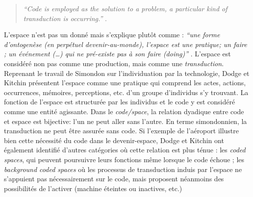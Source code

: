 \begin{quote}
    \textit{``Code is employed as the solution to a problem, a particular kind of transduction  is occurring.''} \citep{Kitchin2011}. 
\end{quote}

L’espace n’est pas un donné mais s’explique plutôt comme : \textit{``une forme d’ontogenèse (en perpétuel devenir-au-monde), l’espace est une pratique; un faire ; un événement (…) qui ne pré-existe pas à son faire (doing)''} \citep{Kitchin2011}. L’espace est considéré non pas comme une production, mais comme une \textit{transduction}. Reprenant le travail de Simondon sur l’individuation par la technologie, Dodge et Kitchin présentent l’espace comme une pratique qui comprend les actes, actions, occurrences, mémoires, perceptions, etc. d’un groupe d’individus s’y trouvant. La fonction de l’espace est structurée par les individus et le code y est considéré comme une entité agissante. Dans le \textit{code/space}, la relation dyadique entre code et espace est bijective: l’un ne peut aller sans l’autre. En terme simondonnien, la transduction ne peut être assurée sans code. Si l’exemple de l’aéroport illustre bien cette nécessité du code dans le devenir-espace, Dodge et Kitchin ont également identifié d’autres catégories où cette relation est plus ténue : les \textit{coded spaces}, qui peuvent poursuivre leurs fonctions même lorsque le code échoue ; les \textit{background coded spaces} où les processus de transduction induis par l’espace ne s’appuient pas nécessairement sur le code, mais proposent néanmoins des possibilités de l’activer (machine éteintes ou inactives, etc.) 

